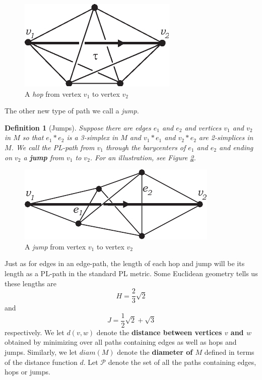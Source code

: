\documentclass[12pt]{article}
\newtheorem{dfn}[thm]{Definition}
\begin{document}
\begin{figure}
	\centering
		\includegraphics[width=0.28\linewidth]{figures/hops.pdf}
    \caption{A {\em hop} from vertex $v_1$ to vertex $v_2$}
    	\label{fig:hop}
\end{figure}

\noindent The other new type of path we call a {\em jump.}

\begin{dfn}[Jumps] Suppose there are edges $e_1$ and $e_2$ and vertices $v_1$ and $v_2$ in $M$ so that $e_1*e_2$ is a 3-simplex in $M$ and $v_1*e_1$ and $v_2*e_2$ are 2-simplices in $M$. We call the PL-path from $v_1$ through the barycenters of $e_1$ and $e_2$ and ending on $v_2$ a \textbf{jump} from $v_1$ to $v_2$. For an illustration, see Figure \ref{fig:jump}.
\end{dfn}

\begin{figure}
	\centering
		\includegraphics[width=0.36\linewidth]{figures/jump.pdf}
    \caption{A {\em jump} from vertex $v_1$ to vertex $v_2$}
    \label{fig:jump}
\end{figure}

Just as for edges in an edge-path, the length of each hop and jump will be its length as a PL-path in the standard PL metric. Some Euclidean geometry tells us these lengths are \begin{equation} \label{eqn:hop_length} H = \frac{2}{3}\sqrt{2} \end{equation} and \begin{equation} \label{eqn:jump_length} J = \frac{1}{2}\sqrt{2} + \sqrt{3} \end{equation} respectively. We let $d(v,w)$ denote the \textbf{distance between vertices $v$ and $w$} obtained by minimizing over all paths containing edges as well as hops and jumps. Similarly, we let $diam(M)$ denote the \textbf{diameter of $M$} defined in terms of the distance function $d$. Let $\mathcal{P}$ denote the set of all the paths containing edges, hops or jumps.
\end{document}
